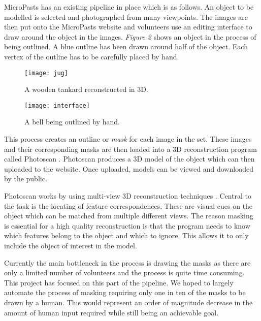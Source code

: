 \documentclass[12pt]{IIBproject}
\begin{document}
 MicroPasts has an existing pipeline in place which is as follows. An object to be modelled is selected and photographed from many viewpoints. The images are then put onto the MicroPasts website and volunteers use an editing interface to draw around the object in the images. \emph{Figure 2} shows an object in the process of being outlined. A blue outline has been drawn around half of the object. Each vertex of the outline has to be carefully placed by hand.
 \begin{figure}[H]
  
  \centering
    \texttt{[image: jug]}
    \caption{A wooden tankard reconstructed in 3D.}
\end{figure}
\begin{figure}
  
  \centering
    \texttt{[image: interface]}
    \caption{A bell being outlined by hand.}
\end{figure} 
  This process creates an outline or \emph{mask} for each image in the set. These images and their corresponding masks are then loaded into a 3D reconstruction program called Photoscan \cite{photoscan}. Photoscan produces a 3D model of the object which can then uploaded to the website. Once uploaded, models can be viewed and downloaded by the public. 

Photoscan works by using multi-view 3D reconstruction techniques \cite{Hartley2004}. Central to the task is the locating of feature correspondences. These are visual cues on the object which can be matched from multiple different views. The reason masking is essential for a high quality reconstruction is that the program needs to know which features belong to the object and which to ignore. This allows it to only include the object of interest in the model.

Currently the main bottleneck in the process is drawing the masks as there are only a limited number of volunteers and the process is quite time consuming. This project has focused on this part of the pipeline. We hoped to largely automate the process of masking requiring only one in ten of the masks to be drawn by a human. This would represent an order of magnitude decrease in the amount of human input required while still being an achievable goal. 
\end{document}
